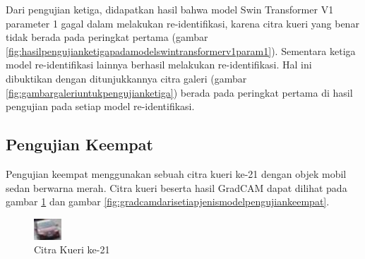Dari pengujian ketiga, didapatkan hasil bahwa model Swin Transformer V1 parameter 1 gagal dalam melakukan re-identifikasi, 
karena citra kueri yang benar tidak berada pada peringkat pertama (gambar 
\ref{fig:hasilpengujianketigapadamodelswintransformerv1param1}). Sementara ketiga model re-identifikasi lainnya berhasil 
melakukan re-identifikasi. Hal ini dibuktikan dengan ditunjukkannya citra galeri (gambar \ref{fig:gambargaleriuntukpengujianketiga})
berada pada peringkat pertama di hasil pengujian pada setiap model re-identifikasi.

\subsection{Pengujian Keempat}

Pengujian keempat menggunakan sebuah citra kueri ke-21 dengan objek mobil sedan berwarna merah. Citra kueri 
beserta hasil GradCAM dapat dilihat pada gambar \ref{fig:gambarkueriuntukpengujiankeempat} dan gambar 
\ref{fig:gradcamdarisetiapjenismodelpengujiankeempat}.

\begin{figure}[h!]
  \centering
  \includegraphics[scale=1]{gambar/Que21_1046.jpg}
  \caption{Citra Kueri ke-21}
  \label{fig:gambarkueriuntukpengujiankeempat}
\end{figure}

